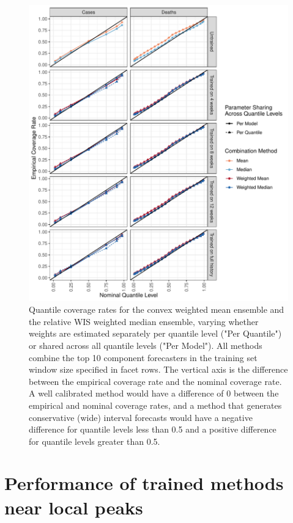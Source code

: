 \documentclass{article}
\begin{document}
\begin{figure}
  \includegraphics[width=\textwidth]{figures/quantile_coverage_quantile_group.pdf}
  \caption{Quantile coverage rates for the convex weighted mean ensemble and the relative WIS weighted median ensemble, varying whether weights are estimated separately per quantile level ("Per Quantile") or shared across all quantile levels ("Per Model"). All methods combine the top 10 component forecasters in the training set window size specified in facet rows. The vertical axis is the difference between the empirical coverage rate and the nominal coverage rate. A well calibrated method would have a difference of 0 between the empirical and nominal coverage rates, and a method that generates conservative (wide) interval forecasts would have a negative difference for quantile levels less than 0.5 and a positive difference for quantile levels greater than 0.5.}
  \label{fig:coverage_quantile_grouping}
\end{figure}

\newpage

\section{Performance of trained methods near local peaks}
\end{document}
